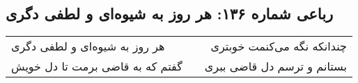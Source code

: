 \begin{center}
\section*{رباعی شماره ۱۳۶: هر روز به شیوه‌ای و لطفی دگری}
\label{sec:136}
\begin{longtable}{l p{0.5cm} r}
هر روز به شیوه‌ای و لطفی دگری
&&
چندانکه نگه می‌کنمت خوبتری
\\
گفتم که به قاضی برمت تا دل خویش
&&
بستانم و ترسم دل قاضی ببری
\\
\end{longtable}
\end{center}
